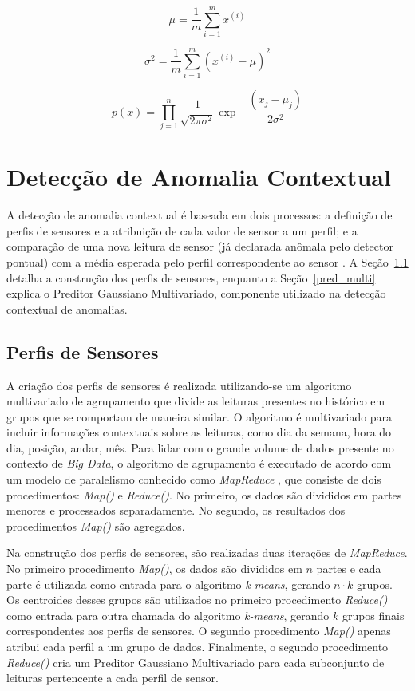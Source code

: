 \documentclass[cic,tc]{iiufrgs}
\begin{document}
\begin{equation}
    \label{uni_mean}
    \mu = \frac{1}{m} \sum_{i=1}^{m} x^{(i)}
\end{equation}

\begin{equation}
    \label{uni_var}
    \sigma^2 = \frac{1}{m} \sum_{i=1}^{m} (x^{(i)} - \mu)^2
\end{equation}

\begin{equation}
    \label{uni_pdf}
    p(x) = \prod_{j=1}^{n} \frac{1}{\sqrt{2\pi\sigma^2}}\exp{-\frac{(x_j - \mu_j)}{2\sigma^2}}
\end{equation}

\section{Detecção de Anomalia Contextual}
\label{anom_contxt}
A detecção de anomalia contextual é baseada em dois processos: a definição de perfis de sensores e a atribuição de cada valor de sensor a um perfil; e a comparação de uma nova leitura de sensor (já declarada anômala pelo detector pontual) com a média esperada pelo perfil correspondente ao sensor \cite{ContextualMichael2014}. A Seção~\ref{sensor_prof} detalha a construção dos perfis de sensores, enquanto a Seção~\ref{pred_multi} explica o Preditor Gaussiano Multivariado, componente utilizado na detecção contextual de anomalias.

\subsection{Perfis de Sensores}
\label{sensor_prof}
A criação dos perfis de sensores é realizada utilizando-se um algoritmo multivariado de agrupamento que divide as leituras presentes no histórico em grupos que se comportam de maneira similar. O algoritmo é multivariado para incluir informações contextuais sobre as leituras, como dia da semana, hora do dia, posição, andar, mês. Para lidar com o grande volume de dados presente no contexto de \textit{Big Data}, o algoritmo de agrupamento é executado de acordo com um modelo de paralelismo conhecido como \textit{MapReduce} \cite{mapreduce2008}, que consiste de dois procedimentos: \textit{Map()} e \textit{Reduce()}. No primeiro, os dados são divididos em partes menores e processados separadamente. No segundo, os resultados dos procedimentos \textit{Map()} são agregados.

Na construção dos perfis de sensores, são realizadas duas iterações de \textit{MapReduce}. No primeiro procedimento \textit{Map()}, os dados são divididos em $n$ partes e cada parte é utilizada como entrada para o algoritmo \textit{k-means}, gerando $n \cdot k$ grupos. Os centroides desses grupos são utilizados no primeiro procedimento \textit{Reduce()} como entrada para outra chamada do algoritmo \textit{k-means}, gerando $k$ grupos finais correspondentes aos perfis de sensores. O segundo procedimento \textit{Map()} apenas atribui cada perfil a um grupo de dados. Finalmente, o segundo procedimento \textit{Reduce()} cria um Preditor Gaussiano Multivariado para cada subconjunto de leituras pertencente a cada perfil de sensor.
\end{document}
